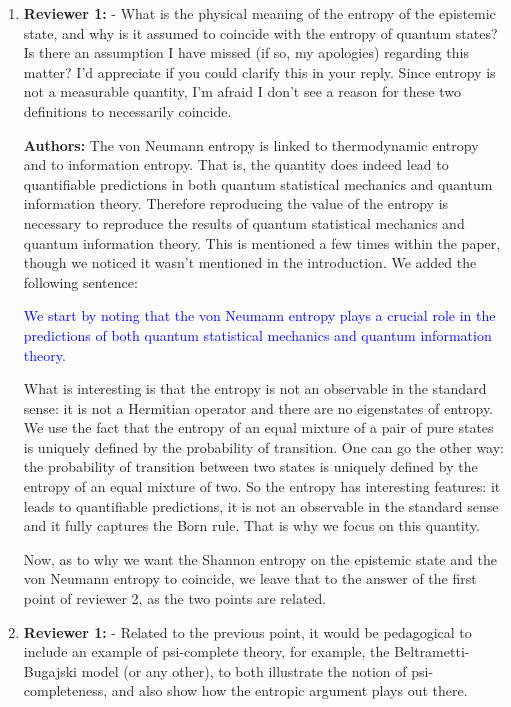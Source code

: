 \documentclass[11pt, executivepaper]{article}
\begin{document}
\begin{enumerate}
	\item \textbf{Reviewer 1:} - What is the physical meaning of the entropy of the epistemic state, and why is it assumed to coincide with the entropy of quantum states? Is there an assumption I have missed (if so, my apologies)  regarding this matter? I'd appreciate if you could clarify this in your reply. Since entropy is not a measurable quantity, I'm afraid I don't see a reason for these two definitions to necessarily coincide.
	\vspace{2mm}
	
	\textbf{Authors:} The von Neumann entropy is linked to thermodynamic entropy and to information entropy. That is, the quantity does indeed lead to quantifiable predictions in both quantum statistical mechanics and quantum information theory. Therefore reproducing the value of the entropy is necessary to reproduce the results of quantum statistical mechanics and quantum information theory. This is mentioned a few times within the paper, though we noticed it wasn't mentioned in the introduction. We added the following sentence:
	
	\textcolor{blue}{We start by noting that the von Neumann entropy plays a crucial role in the predictions of both quantum statistical mechanics and quantum information theory.}
	
	What is interesting is that the entropy is not an observable in the standard sense: it is not a Hermitian operator and there are no eigenstates of entropy. We use the fact that the entropy of an equal mixture of a pair of pure states is uniquely defined by the probability of transition. One can go the other way: the probability of transition between two states is uniquely defined by the entropy of an equal mixture of two. So the entropy has interesting features: it leads to quantifiable predictions, it is not an observable in the standard sense and it fully captures the Born rule. That is why we focus on this quantity. 
	
	Now, as to why we want the Shannon entropy on the epistemic state and the von Neumann entropy to coincide, we leave that to the answer of the first point of reviewer 2, as the two points are related.

\item \textbf{Reviewer 1:} - Related to the previous point, it would be pedagogical to include an example of psi-complete theory, for example, the Beltrametti-Bugajski model (or any other), to both illustrate the notion of psi-completeness, and also show how the entropic argument plays out there.
\vspace{2mm}


\end{enumerate}
\end{document}
